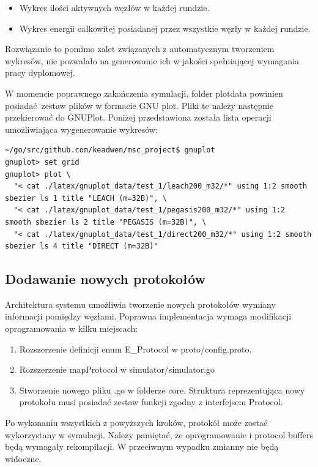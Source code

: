 \documentclass[a4paper,12pt,twoside,openany]{report}
\begin{document}
\begin{itemize}
 \item Wykres ilości aktywnych węzłów w każdej rundzie.
 \item Wykres energii całkowitej posiadanej przez wszystkie węzły w każdej rundzie.
\end{itemize}

Rozwiązanie to pomimo zalet związanych z automatycznym tworzeniem wykresów, nie pozwalało na generowanie ich w jakości spełniającej
wymagania pracy dyplomowej.

W momencie poprawnego zakończenia symulacji, folder plotdata powinien posiadać zestaw plików w formacie GNU plot.
Pliki te należy następnie przekierować do GNUPlot. Poniżej przedstawiona została lista operacji umożliwiająca wygenerowanie wykresów:

\begin{lstlisting}
~/go/src/github.com/keadwen/msc_project$ gnuplot
gnuplot> set grid
gnuplot> plot \
  "< cat ./latex/gnuplot_data/test_1/leach200_m32/*" using 1:2 smooth sbezier ls 1 title "LEACH (m=32B)", \
  "< cat ./latex/gnuplot_data/test_1/pegasis200_m32/*" using 1:2 smooth sbezier ls 2 title "PEGASIS (m=32B)", \
  "< cat ./latex/gnuplot_data/test_1/direct200_m32/*" using 1:2 smooth sbezier ls 4 title "DIRECT (m=32B)"
\end{lstlisting}

\subsection{Dodawanie nowych protokołów}

Architektura systemu umożliwia tworzenie nowych protokołów wymiany informacji pomiędzy węzłami.
Poprawna implementacja wymaga modifikacji oprogramowania w kilku miejscach:

\begin{enumerate}
 \item Rozszerzenie definicji enum E\_Protocol w proto/config.proto.
 \item Rozszerzenie mapProtocol w simulator/simulator.go
 \item Stworzenie nowego pliku .go w folderze core. Struktura reprezentująca nowy protokołu musi posiadać zestaw funkcji zgodny z interfejsem Protocol.
\end{enumerate}

Po wykonaniu wszystkich z powyższych kroków, protokół może zostać wykorzystany w symulacji.
Należy pamiętać, że oprogramowanie i protocol buffers będą wymagały rekompilacji. W przeciwnym wypadku zmianny nie będą widoczne.
\end{document}

